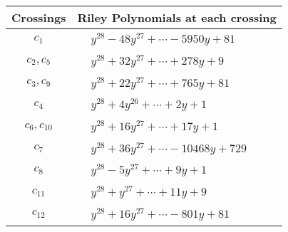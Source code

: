 \documentclass[1p]{elsarticle_modified}
\theoremstyle{definition}
\begin{document}
\begin{tabular}{m{50pt}|m{274pt}}
Crossings & \hspace{64pt}Riley Polynomials at each crossing \\
\hline $$\begin{aligned}c_{1}\end{aligned}$$&$\begin{aligned}
&y^{28}-48 y^{27}+\cdots-5950 y+81
\end{aligned}$\\
\hline $$\begin{aligned}c_{2},c_{5}\end{aligned}$$&$\begin{aligned}
&y^{28}+32 y^{27}+\cdots+278 y+9
\end{aligned}$\\
\hline $$\begin{aligned}c_{3},c_{9}\end{aligned}$$&$\begin{aligned}
&y^{28}+22 y^{27}+\cdots+765 y+81
\end{aligned}$\\
\hline $$\begin{aligned}c_{4}\end{aligned}$$&$\begin{aligned}
&y^{28}+4 y^{26}+\cdots+2 y+1
\end{aligned}$\\
\hline $$\begin{aligned}c_{6},c_{10}\end{aligned}$$&$\begin{aligned}
&y^{28}+16 y^{27}+\cdots+17 y+1
\end{aligned}$\\
\hline $$\begin{aligned}c_{7}\end{aligned}$$&$\begin{aligned}
&y^{28}+36 y^{27}+\cdots-10468 y+729
\end{aligned}$\\
\hline $$\begin{aligned}c_{8}\end{aligned}$$&$\begin{aligned}
&y^{28}-5 y^{27}+\cdots+9 y+1
\end{aligned}$\\
\hline $$\begin{aligned}c_{11}\end{aligned}$$&$\begin{aligned}
&y^{28}+y^{27}+\cdots+11 y+9
\end{aligned}$\\
\hline $$\begin{aligned}c_{12}\end{aligned}$$&$\begin{aligned}
&y^{28}+16 y^{27}+\cdots-801 y+81
\end{aligned}$\\
\hline
\end{tabular}\\~\\
\end{document}
